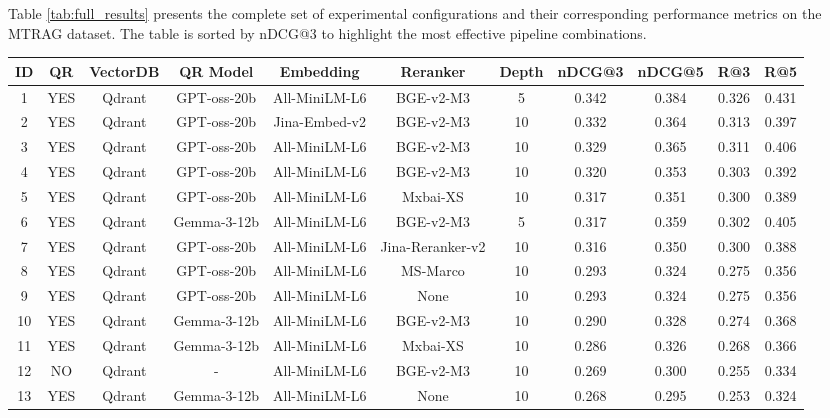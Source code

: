 \documentclass[11pt]{article}
\begin{document}
Table \ref{tab:full_results} presents the complete set of experimental configurations and their corresponding performance metrics on the MTRAG dataset. The table is sorted by nDCG@3 to highlight the most effective pipeline combinations.

\begin{table}[h]
\centering
\scriptsize
\setlength{\tabcolsep}{3pt} %
\renewcommand{\arraystretch}{1.2} %
\begin{tabular}{|c|c|c|c|c|c|c|c|c|c|c|}
\hline
\textbf{ID} & \textbf{QR} & \textbf{VectorDB} & \textbf{QR Model} & \textbf{Embedding} & \textbf{Reranker} & \textbf{Depth} & \textbf{nDCG@3} & \textbf{nDCG@5} & \textbf{R@3} & \textbf{R@5} \\ \hline
1 & YES & Qdrant & GPT-oss-20b & All-MiniLM-L6 & BGE-v2-M3 & 5 & 0.342 & 0.384 & 0.326 & 0.431 \\
2 & YES & Qdrant & GPT-oss-20b & Jina-Embed-v2 & BGE-v2-M3 & 10 & 0.332 & 0.364 & 0.313 & 0.397 \\
3 & YES & Qdrant & GPT-oss-20b & All-MiniLM-L6 & BGE-v2-M3 & 10 & 0.329 & 0.365 & 0.311 & 0.406 \\
4 & YES & Qdrant & GPT-oss-20b & All-MiniLM-L6 & BGE-v2-M3 & 10 & 0.320 & 0.353 & 0.303 & 0.392 \\
5 & YES & Qdrant & GPT-oss-20b & All-MiniLM-L6 & Mxbai-XS & 10 & 0.317 & 0.351 & 0.300 & 0.389 \\
6 & YES & Qdrant & Gemma-3-12b & All-MiniLM-L6 & BGE-v2-M3 & 5 & 0.317 & 0.359 & 0.302 & 0.405 \\
7 & YES & Qdrant & GPT-oss-20b & All-MiniLM-L6 & Jina-Reranker-v2 & 10 & 0.316 & 0.350 & 0.300 & 0.388 \\
8 & YES & Qdrant & GPT-oss-20b & All-MiniLM-L6 & MS-Marco & 10 & 0.293 & 0.324 & 0.275 & 0.356 \\
9 & YES & Qdrant & GPT-oss-20b & All-MiniLM-L6 & None & 10 & 0.293 & 0.324 & 0.275 & 0.356 \\
10 & YES & Qdrant & Gemma-3-12b & All-MiniLM-L6 & BGE-v2-M3 & 10 & 0.290 & 0.328 & 0.274 & 0.368 \\
11 & YES & Qdrant & Gemma-3-12b & All-MiniLM-L6 & Mxbai-XS & 10 & 0.286 & 0.326 & 0.268 & 0.366 \\
12 & NO & Qdrant & - & All-MiniLM-L6 & BGE-v2-M3 & 10 & 0.269 & 0.300 & 0.255 & 0.334 \\
13 & YES & Qdrant & Gemma-3-12b & All-MiniLM-L6 & None & 10 & 0.268 & 0.295 & 0.253 & 0.324 \\

\end{tabular}
\end{table}
\end{document}
